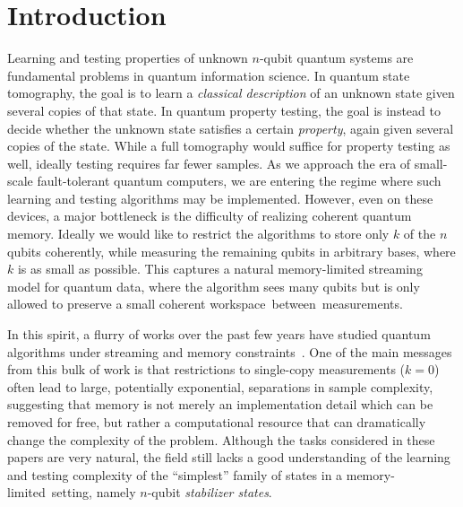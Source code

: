 \documentclass[11pt]{article}
\begin{document}
\newpage

\setcounter{tocdepth}{2}
{\footnotesize \tableofcontents}

\newpage 
\section{Introduction}


Learning and testing properties of unknown $n$-qubit quantum systems are fundamental problems in quantum information science. In quantum state tomography, the goal is to learn a \emph{classical description} of an unknown state given several copies of that state. In quantum property testing, the goal is instead to decide whether the unknown state satisfies a certain \emph{property}, again given several copies of the state. While a full tomography would suffice for property testing as well, ideally testing requires far fewer samples. As we approach the era of small-scale fault-tolerant quantum computers, we are entering the regime where such learning and testing algorithms may be implemented. However, even on these devices, a major bottleneck is the difficulty of realizing coherent quantum memory. Ideally we would like to restrict the algorithms  to store only $k$ of the $n$ qubits coherently, while measuring the remaining qubits in arbitrary bases, where $k$  is as small as possible. This captures a natural memory-limited streaming model for quantum data, where the algorithm sees many qubits but is only allowed to preserve a small coherent workspace~between~measurements.

In this spirit, a flurry of works over the past few years have studied quantum algorithms under streaming and memory constraints~\cite{chen2022exponential,chen2024optimal,chen2025efficient,huang2022quantum,arunachalam2025generalized,gong2024sample,hinsche2025single,aharonov2022quantum,bubeck2020entanglement,chen2022tight,liu2023memory,beckey2025product,arunachalam2023role,oufkir2023sample,caro2024learning,lowe2025lower,king2024triply,liu2024role,chen2024optimaltradeoff,chen2024tight,chen2022quantum,hinsche2026clifford}. One of the main messages from this bulk of work is that restrictions to single-copy measurements ($k=0$) often lead to large, potentially exponential, separations in sample complexity, suggesting that memory is not merely an implementation detail which can be removed for free, but rather a computational resource that can dramatically change the complexity of the problem. Although the tasks considered in these papers are very natural, the field still lacks a good understanding of the learning and testing complexity of the ``simplest'' family of  states in a memory-limited~setting, namely  $n$-qubit \emph{stabilizer states}.
\end{document}
